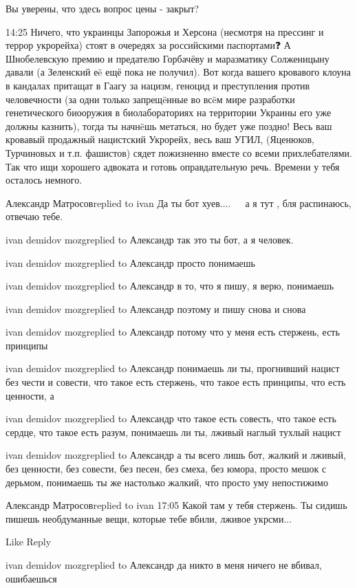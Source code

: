 Вы уверены, что здесь вопрос цены - закрыт?

14:25
Ничего, что украинцы Запорожья и Херсона (несмотря на прессинг и террор укрорейха) стоят в очередях за российскими паспортами❓
А Шнобелевскую премию и предателю Горбачёву и маразматику Солженицыну давали (а Зеленский еë ещё пока не получил).
Вот когда вашего кровавого клоуна в кандалах притащат в Гаагу за нацизм, геноцид и преступления против человечности (за одни только запрещëнные во всëм мире разработки генетического биооружия в биолабораториях на территории Украины его уже должны казнить), тогда ты начнëшь метаться, но будет уже поздно!
Весь ваш кровавый продажный нацистский Укрорейх, весь ваш УГИЛ, (Яценюков, Турчиновых и т.п. фашистов) сядет пожизненно вместе со всеми прихлебателями.
Так что ищи хорошего адвоката и готовь оправдательную речь. Времени у тебя осталось немного.

Александр Матросовreplied to ivan
Да ты бот хуев.... 🤣🤣🤣 а я тут , бля распинаюсь, отвечаю тебе.

ivan demidov mozgreplied to Александр
так это ты бот, а я человек.

ivan demidov mozgreplied to Александр
просто понимаешь

ivan demidov mozgreplied to Александр
в то, что я пишу, я верю, понимаешь

ivan demidov mozgreplied to Александр
поэтому и пишу снова и снова

ivan demidov mozgreplied to Александр
потому что у меня есть стержень, есть принципы

ivan demidov mozgreplied to Александр
понимаешь ли ты, прогнивший нацист без чести и совести, что такое есть стержень, что такое есть принципы, что есть ценности, а

ivan demidov mozgreplied to Александр
что такое есть совесть, что такое есть сердце, что такое есть разум, понимаешь ли ты, лживый наглый тухлый нацист

ivan demidov mozgreplied to Александр
а ты всего лишь бот, жалкий и лживый, без ценности, без совести, без песен, без смеха, без юмора, просто мешок с дерьмом, понимаешь ты же настолько жалкий, что просто уму непостижимо

Александр Матросовreplied to ivan
17:05
Какой там у тебя стержень. Ты сидишь пишешь необдуманные вещи, которые тебе вбили, лживое укрсми...

    Like
    Reply

ivan demidov mozgreplied to Александр
да никто в меня ничего не вбивал, ошибаешься

